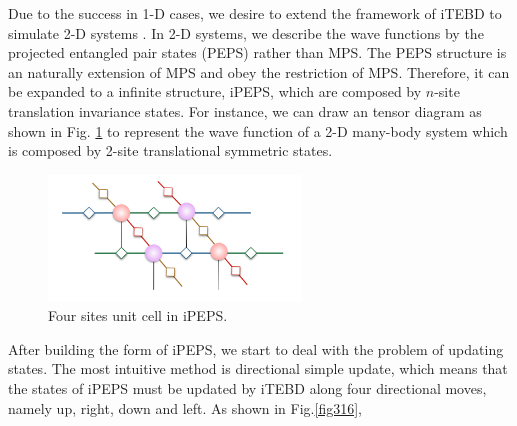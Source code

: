Due to the success in 1-D cases, we desire to extend the framework of iTEBD to simulate 2-D systems . In 2-D systems, we describe the wave functions by the projected entangled pair states (PEPS) rather than MPS. The PEPS structure is an naturally extension of MPS and obey the restriction of MPS. Therefore, it can be expanded to a infinite structure, iPEPS, which are composed by $n$-site translation invariance states. For instance, we can draw an tensor diagram as shown in Fig. \ref{fig315} to represent the wave function of a 2-D many-body system which is composed by 2-site translational symmetric states.

\begin{figure}[ht]
	\centering
	\includegraphics[width=0.6\textwidth]{figures/fig314.png}
	\caption[The tensor diagrams of 2-D lattice]{Four sites unit cell in iPEPS.}
	\label{fig315}
\end{figure}

After building the form of iPEPS, we start to deal with the problem of updating states. The most intuitive method is directional simple update, which means that the states of iPEPS must be updated by iTEBD along four directional moves, namely up, right, down and left. As shown in Fig.\ref{fig316}, 

